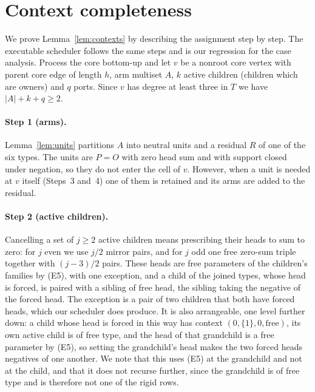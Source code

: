 \documentclass[11pt,a4paper]{article}
\theoremstyle{plain}
\theoremstyle{definition}
\theoremstyle{remark}
\newcommand{\PO}{P\!=\!O}
\begin{document}
\appendix
\section{Context completeness}\label{app:contexts}

We prove Lemma~\ref{lem:contexts} by describing the assignment step by step.
The executable scheduler follows the same steps and is our regression for the
case analysis.  Process the core bottom-up and let $v$ be a nonroot core
vertex with parent core edge of length $h$, arm multiset $A$, $k$ active
children (children which are owners) and $q$ ports.  Since $v$ has degree at
least three in $T$ we have $|A|+k+q\ge 2$.

\paragraph{Step 1 (arms).}
Lemma~\ref{lem:units} partitions $A$ into neutral units and a residual $R$ of
one of the six types.  The units are $\PO$ with zero head sum and with support
closed under negation, so they do not enter the cell of $v$.  However, when a
unit is needed at $v$ itself (Steps~3 and~4) one of them is retained and its
arms are added to the residual.

\paragraph{Step 2 (active children).}
Cancelling a set of $j\ge 2$ active children means prescribing their heads to
sum to zero: for $j$ even we use $j/2$ mirror pairs, and for $j$ odd one free
zero-sum triple together with $(j-3)/2$ pairs.  These heads are free parameters
of the children's families by (E5), with one exception, and a child of the
joined types, whose head is forced, is paired with a sibling of free head, the
sibling taking the negative of the forced head.  The exception is a pair of two
children that both have forced heads, which our scheduler does produce.  It is
also arrangeable, one level further down: a child whose head is forced in this
way has context $(0,\{1\},0,\mathrm{free})$, its own active child is of free
type, and the head of that grandchild is a free parameter by (E5), so setting
the grandchild's head makes the two forced heads negatives of one another.  We
note that this uses (E5) at the grandchild and not at the child, and that it
does not recurse further, since the grandchild is of free type and is therefore
not one of the rigid rows.
\end{document}
